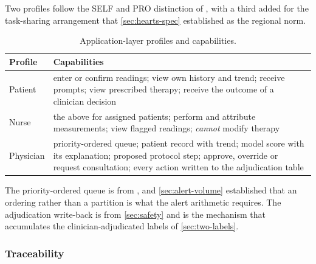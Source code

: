 \documentclass[12pt,a4paper,oneside]{report}
\begin{document}
Two profiles follow the SELF and PRO distinction of \textcite{mucchi2021}, with a third added for the task-sharing arrangement that \cref{sec:hearts-spec} established as the regional norm.

\begin{table}[htbp]
\centering\small
\caption{Application-layer profiles and capabilities.}\label{tab:profiles}
\begin{tabularx}{\textwidth}{@{}>{\raggedright\arraybackslash}p{2.1cm} X@{}}
\toprule
\textbf{Profile} & \textbf{Capabilities} \\
\midrule
Patient & enter or confirm readings; view own history and trend; receive prompts; view prescribed therapy; receive the outcome of a clinician decision \\
Nurse & the above for assigned patients; perform and attribute measurements; view flagged readings; \emph{cannot} modify therapy \\
Physician & priority-ordered queue; patient record with trend; model score with its explanation; proposed protocol step; approve, override or request consultation; every action written to the adjudication table \\
\bottomrule
\end{tabularx}
\end{table}

The priority-ordered queue is from \textcite{yazdani2018}, and \cref{sec:alert-volume} established that an ordering rather than a partition is what the alert arithmetic requires. The adjudication write-back is from \cref{sec:safety} and is the mechanism that accumulates the clinician-adjudicated labels of \cref{sec:two-labels}.

\subsubsection{Traceability}\label{sec:traceability}
\end{document}
